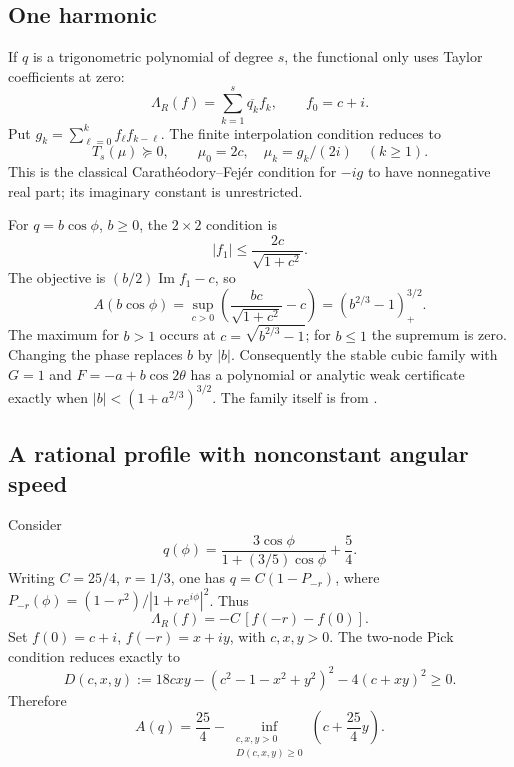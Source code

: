 \documentclass[11pt,a4paper]{article}
\theoremstyle{remark}\newtheorem{remark}[theorem]{Remark}
\newcommand{\D}{\mathbb D}
\newcommand{\Ima}{\operatorname{Im}}
\begin{document}
\subsection{One harmonic}
If \(q\) is a trigonometric polynomial of degree \(s\), the
functional only uses Taylor coefficients at zero:
\[
 \Lambda_R(f)=\sum_{k=1}^s\overline{q_k}f_k,\qquad f_0=c+i.
\]
Put \(g_k=\sum_{\ell=0}^k f_\ell f_{k-\ell}\).
The finite interpolation condition reduces to
\[
 T_s(\mu)\succeq0,\qquad
 \mu_0=2c,\quad \mu_k=g_k/(2i)\quad(k\geq1).
\]
This is the classical Carath\'eodory--Fej\'er condition for
\(-ig\) to have nonnegative real part; its imaginary constant is
unrestricted.

For \(q=b\cos\phi\), \(b\geq0\), the \(2\times2\) condition is
\[
 |f_1|\leq \frac{2c}{\sqrt{1+c^2}}.
\]
The objective is \((b/2)\Ima f_1-c\), so
\begin{equation}\label{eq:single}
 A(b\cos\phi)
 =\sup_{c>0}\left(\frac{bc}{\sqrt{1+c^2}}-c\right)
 =(b^{2/3}-1)_+^{3/2}.
\end{equation}
The maximum for \(b>1\) occurs at \(c=\sqrt{b^{2/3}-1}\);
for \(b\leq1\) the supremum is zero.
Changing the phase replaces \(b\) by \(|b|\).
Consequently the stable cubic family with \(G=1\) and
\(F=-a+b\cos2\theta\) has a polynomial or analytic weak certificate
exactly when \(|b|<(1+a^{2/3})^{3/2}\).
The family itself is from \cite{liu}.

\subsection{A rational profile with nonconstant angular speed}
Consider
\begin{equation}\label{eq:qexample}
 q(\phi)=\frac{3\cos\phi}{1+(3/5)\cos\phi}+\frac54.
\end{equation}
Writing \(C=25/4\), \(r=1/3\), one has
\(q=C(1-P_{-r})\), where
\(P_{-r}(\phi)=(1-r^2)/|1+r e^{i\phi}|^2\).
Thus
\[
 \Lambda_R(f)=-C\,[f(-r)-f(0)].
\]
Set \(f(0)=c+i\), \(f(-r)=x+iy\), with \(c,x,y>0\).
The two-node Pick condition reduces exactly to
\begin{equation}\label{eq:D}
 D(c,x,y):=18cxy-(c^2-1-x^2+y^2)^2-4(c+xy)^2\geq0.
\end{equation}
Therefore
\begin{equation}\label{eq:Aexample}
 A(q)=\frac{25}{4}-
      \inf_{\substack{c,x,y>0\\D(c,x,y)\geq0}}
      \left(c+\frac{25}{4}y\right).
\end{equation}
\end{document}
